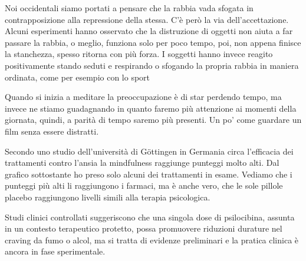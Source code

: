 \documentclass[12pt]{book} %
\begin{document}
Noi occidentali siamo portati a pensare che la rabbia vada sfogata in contrapposizione alla repressione della stessa.
C'è però la via dell'accettazione. Alcuni esperimenti hanno osservato che la
distruzione di oggetti non aiuta a far passare la rabbia, o meglio, funziona solo per poco tempo, poi, non appena finisce la stanchezza, spesso ritorna con più forza. I soggetti hanno invece reagito positivamente stando seduti e respirando o sfogando la propria rabbia in maniera
ordinata, come per esempio con lo sport

Quando si inizia a meditare la preoccupazione è di star perdendo tempo, ma invece ne stiamo guadagnando in quanto faremo più attenzione ai momenti della giornata, quindi, a parità di tempo saremo più presenti. Un po' come guardare un film senza essere distratti.

Secondo uno studio dell'università di Göttingen in Germania circa l'efficacia
dei trattamenti contro
l'ansia la mindfulness raggiunge punteggi molto alti. Dal grafico sottostante ho preso solo alcuni dei trattamenti in esame.
Vediamo che i punteggi più alti li raggiungono i farmaci, ma è anche vero, che le sole pillole placebo raggiungono
livelli simili alla terapia psicologica.

\needspace{4cm}
\begin{figure}[H]
  \centering
\end{figure}

Studi clinici controllati suggeriscono che una singola dose di psilocibina, assunta in un contesto terapeutico protetto, possa promuovere riduzioni durature nel craving da fumo o alcol, ma si tratta di evidenze preliminari e la pratica clinica è ancora in fase sperimentale.
\end{document}
